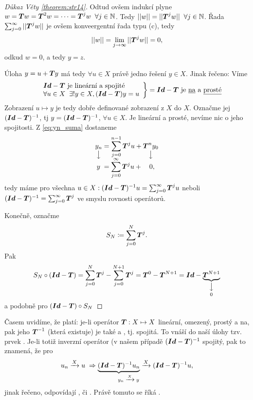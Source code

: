 \begin{proof}[Důkaz Věty \ref{theorem:str14}]
Odtud ovšem indukcí plyne $w= \boldsymbol{T} w= \boldsymbol{T} ^2w=\dots = \boldsymbol{T} ^jw \;\; \forall j\in \mathbb{N}$.  Tedy $||w||=|| \boldsymbol{T} ^jw||\;\; \forall j\in \mathbb{N}$. Řada $\sum_{j=0}^\infty|| \boldsymbol{T} ^j w||$ je ovšem konveergentní řada typu (c), tedy 
$$||w||=\lim\limits_{j\rightarrow\infty}|| \boldsymbol{T} ^jw||=0,$$
odkud $w=0$, a tedy $y=z$.

Úloha $y=u+ \boldsymbol{T} y$ má tedy $\forall u\in X$ právě jedno řešení $y\in X$. Jinak řečeno: Víme \begin{equation*}
    \begin{split}
        \left.
    \begin{array}{ll}
        &\boldsymbol{Id}- \boldsymbol{T}  \text{ je lineární a spojité} \\
        &\forall u\in X\;\;\exists ! y\in X, (\boldsymbol{Id}-\boldsymbol{T})y=u
    \end{array}
        \right \}=\boldsymbol{Id}- \boldsymbol{T}  \text{ je \underline{na} a \underline{prosté}}
    \end{split}
\end{equation*}
Zobrazení $u\mapsto y$ je tedy dobře definované zobrazení z $X$ do $X$. Označme jej $(\boldsymbol{Id} - \boldsymbol{T} )^{-1}$, tj $y=(\boldsymbol{Id}- \boldsymbol{T} )^{-1}$, $\forall u\in X$. Je lineární a prosté, nevíme nic o jeho spojitosti.
Z \ref{eq:yn_suma} dostaneme 
\begin{equation*}
    \begin{split}
        \underset{\big\downarrow}{y_n} &= \sum\limits_{j=0}^{n-1} \boldsymbol{T} ^ju+\underset{\big\downarrow}{ \boldsymbol{T} ^ny_0}\\[-7pt]
        y\;&=\sum\limits_{j=0}^\infty  \boldsymbol{T} ^ju+\quad0,
    \end{split}
\end{equation*}
tedy máme pro všechna $u\in X: (\boldsymbol{Id}- \boldsymbol{T} )^{-1}u=\sum_{j=0}^\infty  \boldsymbol{T} ^ju$ neboli $(\boldsymbol{Id}- \boldsymbol{T} )^{-1}=\sum_{j=0}^\infty  \boldsymbol{T} ^j$ ve smyslu rovnosti operátorů.

Konečně, označme
$$S_N\coloneqq \sum\limits_{j=0}^N  \boldsymbol{T} ^j.$$
Pak 
$$S_N\circ(\boldsymbol{Id}- \boldsymbol{T} )=\sum\limits_{j=0}^N  \boldsymbol{T} ^j-\sum\limits_{j=0}^{N+1}  \boldsymbol{T} ^j =  \boldsymbol{T} ^0- \boldsymbol{T} ^{N+1}=\boldsymbol{Id}-\underset{0}{\underbrace{ \boldsymbol{T} ^{N+1}}_{\big\downarrow}}$$
a podobně pro $(\boldsymbol{Id}- \boldsymbol{T} )\circ S_N$
\end{proof}

\begin{remark}
Časem uvidíme, že platí: je-li operátor $ \boldsymbol{T} :X\mapsto X$ lineární, omezený, prostý a na, pak jeho  $ \boldsymbol{T} ^{-1}$ (která existuje) je také  a , tj. spojitá. To vnáší do naší úlohy tzv. prvek . Je-li totiž inverzní operátor (v našem případě $(\boldsymbol{Id}- \boldsymbol{T} )^{-1}$ spojitý, pak to znamená, že pro 
$$u_n\xrightarrow{X}u\;\Rightarrow\; \underset{\quad\; y_n\;\xrightarrow{X}\;y}{\underbrace{(\boldsymbol{Id}- \boldsymbol{T} )^{-1}u_n}\xrightarrow{X}}(\boldsymbol{Id}- \boldsymbol{T} )^{-1}u,$$
jinak řečeno,  odpovídají , či . Právě tomuto se říká .
\end{remark}

